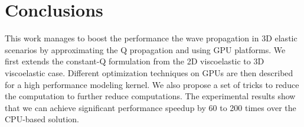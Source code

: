 \documentclass{paris17}
\begin{document}
\section{Conclusions}

This work manages to boost the performance the wave propagation in 3D elastic scenarios by approximating the Q propagation and using GPU platforms. We first extends the constant-Q formulation from the 2D viscoelastic to 3D viscoelastic case. Different optimization techniques on GPUs are then described for a high performance modeling kernel. We also propose a set of tricks to reduce the computation to further reduce computations. The experimental results show that we can achieve significant performance speedup by 60 to 200 times over the CPU-based solution.



\end{document}
